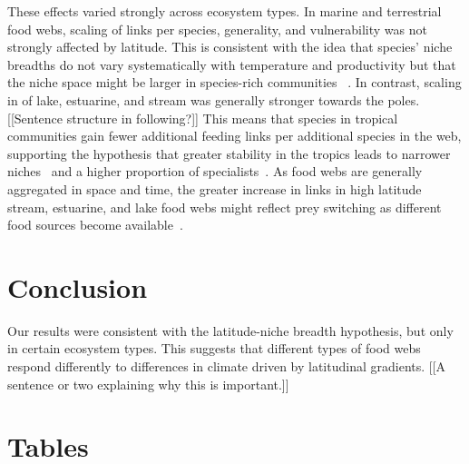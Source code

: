 \documentclass[12pt]{article}
\begin{document}
These effects varied strongly across ecosystem types. In marine and terrestrial food webs,
scaling of links per species, generality, and vulnerability was not strongly affected by
latitude. This is consistent with the idea that species' niche breadths do not vary systematically
with temperature and productivity but that the niche space might be larger in species-rich communities
~\citep{Davies2007}. In contrast, scaling in of lake, estuarine, and stream was generally stronger
towards the poles. [[Sentence structure in following?]] This means that species in tropical communities gain fewer additional feeding links
per additional species in the web, supporting the hypothesis that greater stability in the tropics
leads to narrower niches~\citep{Brown2004} and a higher proportion of specialists~\citep{}. As food webs
are generally aggregated in space and time, the greater increase in links in high latitude stream, 
estuarine, and lake food webs might reflect prey switching as different food sources become
available~\citep{}. 


\section*{Conclusion}

Our results were consistent with the latitude-niche breadth hypothesis, but only in certain ecosystem
types. This suggests that different types of food webs respond differently to differences in climate
driven by latitudinal gradients. [[A sentence or two explaining why this is important.]]


\newpage

\newpage

\section*{Tables}
\end{document}
